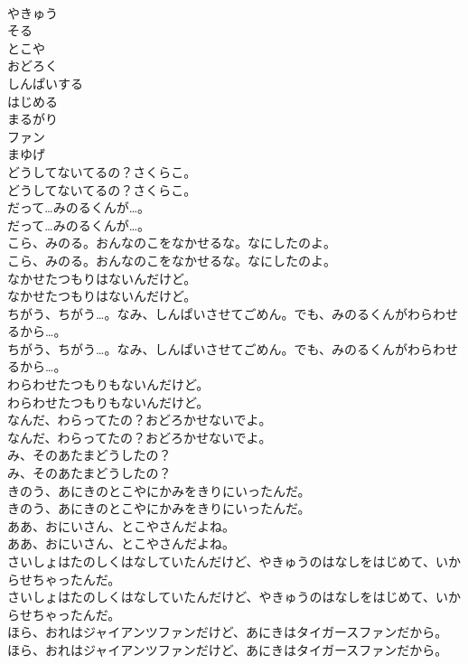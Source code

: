 \documentclass[8pt]{extreport}
\begin{document}
\begin{CJK}{UTF8}{min}
\\	やきゅう
\\	そる
\\	とこや
\\	おどろく
\\	しんぱいする
\\	はじめる
\\	まるがり
\\	ファン
\\	まゆげ
\\	どうしてないてるの？さくらこ。
\\	どうしてないてるの？さくらこ。
\\	だって…みのるくんが…。
\\	だって…みのるくんが…。
\\	こら、みのる。おんなのこをなかせるな。なにしたのよ。
\\	こら、みのる。おんなのこをなかせるな。なにしたのよ。
\\	なかせたつもりはないんだけど。
\\	なかせたつもりはないんだけど。
\\	ちがう、ちがう…。なみ、しんぱいさせてごめん。でも、みのるくんがわらわせるから…。
\\	ちがう、ちがう…。なみ、しんぱいさせてごめん。でも、みのるくんがわらわせるから…。
\\	わらわせたつもりもないんだけど。
\\	わらわせたつもりもないんだけど。
\\	なんだ、わらってたの？おどろかせないでよ。
\\	なんだ、わらってたの？おどろかせないでよ。
\\	み、そのあたまどうしたの？
\\	み、そのあたまどうしたの？
\\	きのう、あにきのとこやにかみをきりにいったんだ。
\\	きのう、あにきのとこやにかみをきりにいったんだ。
\\	ああ、おにいさん、とこやさんだよね。
\\	ああ、おにいさん、とこやさんだよね。
\\	さいしょはたのしくはなしていたんだけど、やきゅうのはなしをはじめて、いからせちゃったんだ。
\\	さいしょはたのしくはなしていたんだけど、やきゅうのはなしをはじめて、いからせちゃったんだ。
\\	ほら、おれはジャイアンツファンだけど、あにきはタイガースファンだから。
\\	ほら、おれはジャイアンツファンだけど、あにきはタイガースファンだから。

\end{CJK}
\end{document}
